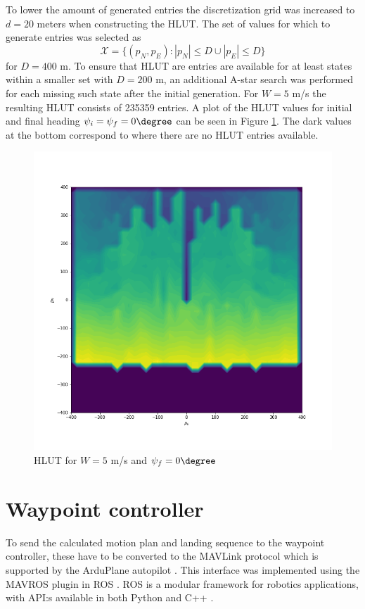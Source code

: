 To lower the amount of generated entries the discretization grid was increased to $d=20$ meters when constructing the HLUT. The set of 
values for which to generate entries was selected as 
\begin{equation}
    \mathcal{X}=\{(p_N,p_E): |p_N|\leq D \cup |p_E| \leq D\}
\end{equation}
for $D=400$ m. To ensure that HLUT are entries are available for at least states within a smaller set with $D=200$ m, an additional 
A-star search was performed for each missing such state after the initial generation. For $W=5$ m/s the resulting HLUT consists of 235359 entries. 
A plot of the HLUT values for initial and final heading $\psi_i=\psi_f=0\degree$ can be seen in Figure \ref{fig:hlut}. The dark values at the bottom correspond to where there are no HLUT entries available. 

\begin{figure}
    \begin{center}
        \includegraphics[width=.6\linewidth]{hlut}
    \end{center}
    \caption{HLUT for $W=5$ m/s and $\psi_f=0\degree$}
    \label{fig:hlut}
\end{figure}

\section{Waypoint controller}
To send the calculated motion plan and landing sequence to the waypoint controller, these have to be converted to the 
MAVLink protocol which is supported by the ArduPlane autopilot \cite{mavlink}. This interface was implemented using the MAVROS 
plugin in ROS \cite{mavros}. ROS is a modular framework for robotics applications, with API:s available in both Python and C++ \cite{ros}.
